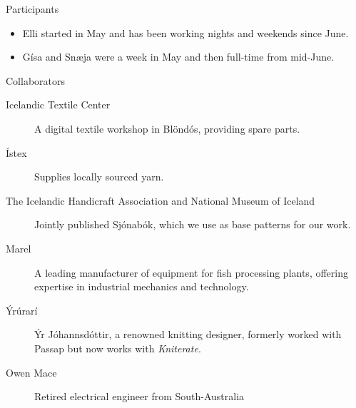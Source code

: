 \documentclass[
    NAME={Dr. Helga Ingimundardóttir},
    EMAIL={helgaingim@hi.is},
    FACULTY={Industrial Engineering},
    TITLE={HiDef Textiles: Reviving Tradition with Innovation},
    SUBTITLE={Empowering Creativity and Sustainability in Textile Production through Digital Transformation},
    SEMINAR={Reykjavík DataBeers},
    DATE={January 25, 2025},
    WIDE={true}
]{HI-LaTeX/hi-beamer}
\begin{document}
\begin{frame}[allowframebreaks]{Participants}
\begin{itemize}
    \item Elli started in May and has been working nights and weekends since June. 
    \item Gísa and Snæja were a week in May and then full-time from mid-June. 
\end{itemize}

\framebreak
\begin{block}{Collaborators}
\begin{description}
    \item[Icelandic Textile Center] A digital textile workshop in Blöndós, providing spare parts.
    \item[Ístex] Supplies locally sourced yarn.
    \item[The Icelandic Handicraft Association and National Museum of Iceland] Jointly published  \alert{Sjónabók}, which we use as base patterns for our work.
    \item[Marel] A leading manufacturer of equipment for fish processing plants, offering expertise in industrial mechanics and technology.
    \item[Ýrúrarí] Ýr Jóhannsdóttir, a renowned knitting designer, formerly worked with Passap but now works with \emph{Kniterate}.    
    \item[Owen Mace] Retired electrical engineer from South-Australia 
\end{description}
\end{block}

\end{frame}
\end{document}
